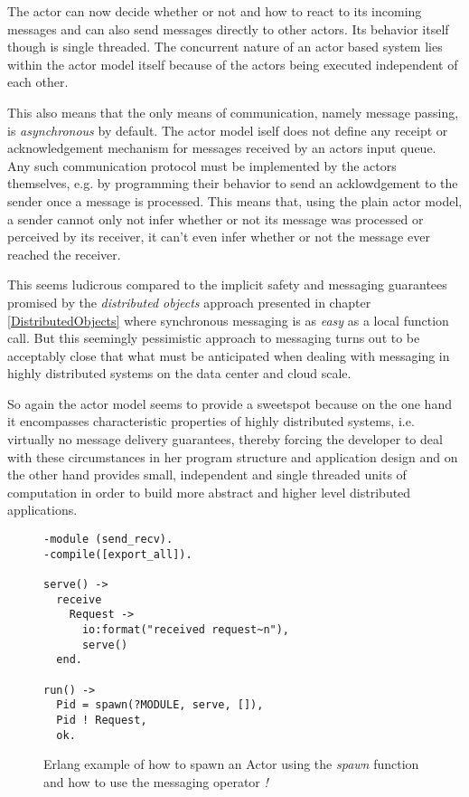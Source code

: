 The actor can now decide whether or not and how to react to
its incoming messages and can also send messages directly to other
actors. Its behavior itself though is single threaded.
The concurrent nature of an actor based system lies within the
actor model itself because of the actors being executed independent
of each other.

This also means that the only means of communication,
namely message passing, is \textit{asynchronous} by default.
The actor model iself does not define any receipt or acknowledgement mechanism
for messages received by an actors input queue. Any such communication
protocol must be implemented by the actors themselves, e.g. by
programming their behavior to send an acklowdgement to the sender once
a message is processed. This means that, using the plain actor model,
a sender cannot only not infer whether or not its message was processed
or perceived by its receiver, it can't even infer whether or not
the message ever reached the receiver.
\newline

This seems ludicrous compared to the implicit safety and messaging
guarantees promised by the \textit{distributed objects} approach
presented in chapter \ref{DistributedObjects} where synchronous
messaging is as \textit{easy} as a local function call. But this
seemingly pessimistic approach to messaging turns out to be
acceptably close that what must be anticipated when dealing with
messaging in highly distributed systems on the data center and cloud
scale.

So again the actor model seems to provide a sweetspot because on
the one hand it encompasses characteristic properties of highly
distributed systems, i.e. virtually no message delivery guarantees,
thereby forcing the developer to deal with these circumstances
in her program structure and application design and on the other
hand provides small, independent and single threaded units of
computation in order to build more abstract and higher level
distributed applications.

\setlength{\intextsep}{10pt}
\setlength{\columnsep}{20pt}

\begin{wrapfigure}{l}{0.5\textwidth}
    \begin{lstlisting}
-module (send_recv).
-compile([export_all]).

serve() ->
  receive
    Request ->
      io:format("received request~n"),
      serve()
  end.

run() ->
  Pid = spawn(?MODULE, serve, []),
  Pid ! Request,
  ok.
    \end{lstlisting}
  \caption{Erlang example of how to spawn an Actor using the \textit{spawn}
          function and how to use the messaging operator \textit{!}}
  \label{erlang-example}
  \vspace{-20mm}
\end{wrapfigure}

